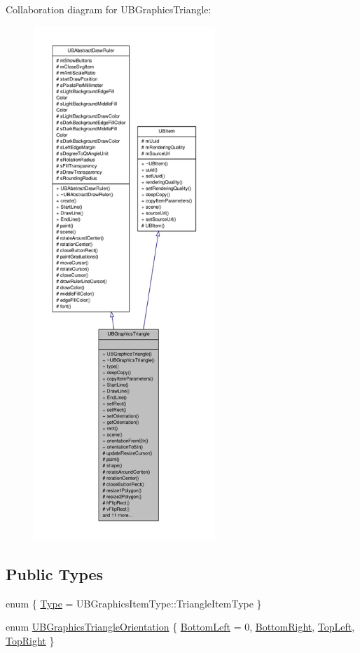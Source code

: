 Collaboration diagram for U\-B\-Graphics\-Triangle\-:
\nopagebreak
\begin{figure}[H]
\begin{center}
\leavevmode
\includegraphics[height=550pt]{d8/d11/class_u_b_graphics_triangle__coll__graph}
\end{center}
\end{figure}
\subsection*{Public Types}
\begin{DoxyCompactItemize}
\item 
enum \{ \hyperlink{class_u_b_graphics_triangle_a238311e6de7d7a1ee5227f123dc0eceda516a2724cf06dfe805262241ccc4eca5}{Type} =  U\-B\-Graphics\-Item\-Type\-:\-:Triangle\-Item\-Type
 \}
\item 
enum \hyperlink{class_u_b_graphics_triangle_a2bcbf42a1d36e4d35bbad30e742a2b65}{U\-B\-Graphics\-Triangle\-Orientation} \{ \hyperlink{class_u_b_graphics_triangle_a2bcbf42a1d36e4d35bbad30e742a2b65ac24d71a83a1e55e13fc96f8d70b82a68}{Bottom\-Left} =  0, 
\hyperlink{class_u_b_graphics_triangle_a2bcbf42a1d36e4d35bbad30e742a2b65a206c1bb8de72144b42449ed74ad3bb7a}{Bottom\-Right}, 
\hyperlink{class_u_b_graphics_triangle_a2bcbf42a1d36e4d35bbad30e742a2b65a81729ee0f9a034e4c2a9e2c9c08f2d7e}{Top\-Left}, 
\hyperlink{class_u_b_graphics_triangle_a2bcbf42a1d36e4d35bbad30e742a2b65acb9b3e80f0533fc8facfc3863194e48f}{Top\-Right}
 \}
\end{DoxyCompactItemize}
